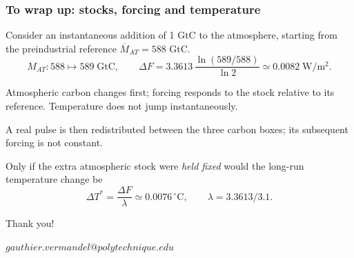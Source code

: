 \documentclass[xcolor=x11names,compress,aspectratio=169]{beamer}%
\makeatletter
\renewenvironment{itemize}{\begin{compactitemize}[<+-| alert@+>]}{\end{compactitemize}}
\makeatother
\begin{document}
\begin{frame}
\frametitle{To wrap up: stocks, forcing and temperature}
\small
Consider an instantaneous addition of 1 GtC to the atmosphere, starting
from the preindustrial reference $\overline M_{AT}=588$ GtC.
\[
M_{AT}:588\longmapsto589\;\mathrm{GtC},\qquad
\Delta F=3.3613\,\frac{\ln(589/588)}{\ln 2}
\simeq 0.0082\;\mathrm{W/m^2}.
\]
\begin{itemize}
\item Atmospheric carbon changes first; forcing responds to the stock
relative to its reference. Temperature does not jump instantaneously.
\item A real pulse is then redistributed between the three carbon boxes;
its subsequent forcing is not constant.
\item Only if the extra atmospheric stock were \emph{held fixed} would
the long-run temperature change be
\[
\Delta T^*=\frac{\Delta F}{\lambda}\simeq0.0076\,{}^\circ\mathrm C,
\qquad \lambda=3.3613/3.1.
\]
\end{itemize}
\transboxout
\end{frame}
%

\begin{frame}%


\begin{center}
Thank you!

\vspace{5ex}

$gauthier.vermandel@polytechnique.edu$
\end{center}

%

\transboxout
\end{frame}%
\end{document}
